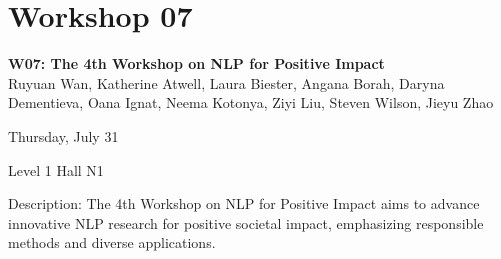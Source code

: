 \clearpage


\section[W07: The 4th Workshop on NLP for Positive Impact]{Workshop 07}
\label{workshop_7}

\begin{center}
    {\Large \textbf{W07: The 4th Workshop on NLP for Positive Impact}}\\

    Ruyuan Wan, Katherine Atwell, Laura Biester, Angana Borah, Daryna Dementieva, Oana Ignat, Neema Kotonya, Ziyi Liu, Steven Wilson, Jieyu Zhao

   Thursday, July 31
    
    Level 1 Hall N1

\end{center}

Description: The 4th Workshop on NLP for Positive Impact aims to advance innovative NLP research for positive societal impact, emphasizing responsible methods and diverse applications.

